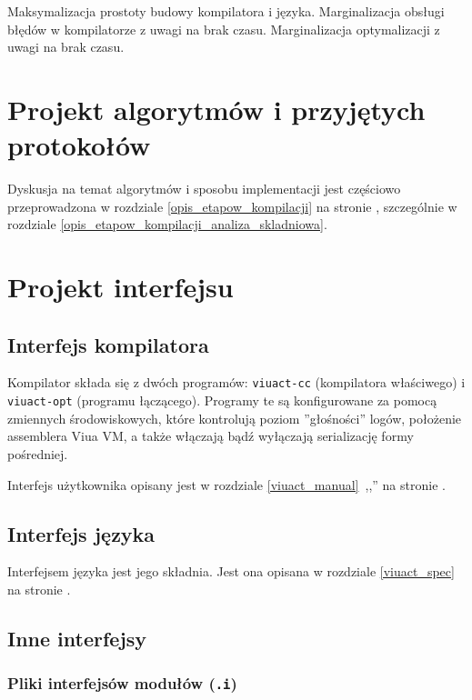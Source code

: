 Maksymalizacja prostoty budowy kompilatora i języka.
Marginalizacja obsługi błędów w kompilatorze z uwagi na brak czasu.
Marginalizacja optymalizacji z uwagi na brak czasu.

\section{Projekt algorytmów i przyjętych protokołów}

Dyskusja na temat algorytmów i sposobu implementacji jest częściowo przeprowadzona w rozdziale
\ref{opis_etapow_kompilacji} na stronie \pageref{opis_etapow_kompilacji}, szczególnie w rozdziale
\ref{opis_etapow_kompilacji_analiza_skladniowa}.

\section{Projekt interfejsu}

\subsection{Interfejs kompilatora}

Kompilator składa się z dwóch programów: \texttt{viuact-cc} (kompilatora właściwego) i \texttt{viuact-opt}
(programu łączącego). Programy te są konfigurowane za pomocą zmiennych środowiskowych, które kontrolują poziom
''głośności'' logów, położenie assemblera Viua VM, a także włączają bądź wyłączają serializację formy
pośredniej.

Interfejs użytkownika opisany jest w rozdziale \ref{viuact_manual}~,,''
na stronie \pageref{viuact_manual}.

\subsection{Interfejs języka}

Interfejsem języka jest jego składnia.
Jest ona opisana w rozdziale \ref{viuact_spec} na stronie \pageref{viuact_spec}.

\subsection{Inne interfejsy}

\subsubsection{Pliki interfejsów modułów (\texttt{.i})}
\label{pliki_interfejsow_modulow}

